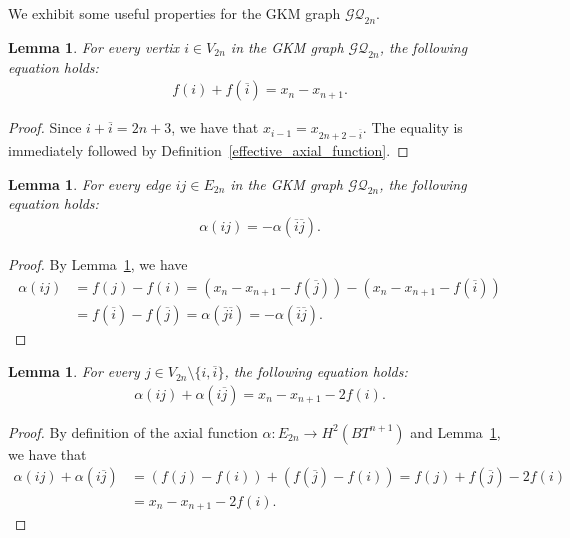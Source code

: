 \documentclass[12pt]{amsart}
\newtheorem{lemma}[theorem]{Lemma}
\theoremstyle{remark}
\numberwithin{equation}{section}
\begin{document}
We exhibit some useful properties for the GKM graph $\mathcal{GQ}_{2n}$.
\begin{lemma}
\label{easy-equation1}
For every vertix $i\in V_{2n}$ in the GKM graph $\mathcal{GQ}_{2n}$, the following equation holds: 
\begin{align*}
f(i)+f(\overline{i})=x_{n}-x_{n+1}.
\end{align*}
\end{lemma}
\begin{proof}
Since $i+\overline{i}=2n+3$, we have that $x_{i-1}=x_{2n+2-\overline{i}}$.
The equality is immediately followed by Definition~\ref{effective_axial_function}.
\end{proof}

\begin{lemma}
\label{easy-equation2}
For every edge $ij\in E_{2n}$ in the GKM graph $\mathcal{GQ}_{2n}$, the following equation holds: 
\begin{align*}
\alpha(ij)=-\alpha(\overline{i}\overline{j}).
\end{align*}
\end{lemma}
\begin{proof}
By Lemma~\ref{easy-equation1}, we have 
\begin{align*}
\alpha(ij)&=f(j)-f(i)=(x_{n}-x_{n+1}-f(\overline{j}))-(x_{n}-x_{n+1}-f(\overline{i})) \\
&=f(\overline{i})-f(\overline{j})=\alpha(\overline{j}\overline{i})=-\alpha(\overline{i}\overline{j}).
\end{align*}
\end{proof}

\begin{lemma}
\label{well-definedness-of-M}
For every $j\in V_{2n}\setminus \{i,\overline{i}\}$, the following equation holds:
\begin{align*}
\alpha(ij)+\alpha(i\overline{j})=x_{n}-x_{n+1}-2f(i). %
\end{align*}
\end{lemma}
\begin{proof}
By definition of the axial function $\alpha:E_{2n}\to H^{2}(BT^{n+1})$ and Lemma~\ref{easy-equation1}, we have that 
\begin{align*}
\alpha(ij)+\alpha(i\overline{j})&=(f(j)-f(i))+(f(\overline{j})-f(i))=f(j)+f(\overline{j})-2f(i) \\
&=x_{n}-x_{n+1}-2f(i).
\end{align*} 
\end{proof}
\end{document}
